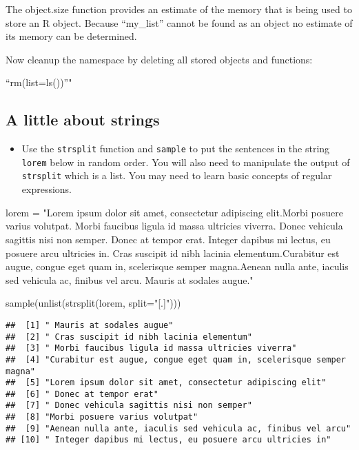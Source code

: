 \documentclass[
]{article}
\newenvironment{Shaded}{\begin{snugshade}}{\end{snugshade}}
\newcommand{\AttributeTok}[1]{\textcolor[rgb]{0.77,0.63,0.00}{#1}}
\newcommand{\FunctionTok}[1]{\textcolor[rgb]{0.00,0.00,0.00}{#1}}
\newcommand{\NormalTok}[1]{#1}
\newcommand{\OtherTok}[1]{\textcolor[rgb]{0.56,0.35,0.01}{#1}}
\newcommand{\StringTok}[1]{\textcolor[rgb]{0.31,0.60,0.02}{#1}}
\providecommand{\tightlist}{%
  \setlength{\itemsep}{0pt}\setlength{\parskip}{0pt}}
\begin{document}
The object.size function provides an estimate of the memory that is
being used to store an R object. Because ``my\_list'' cannot be found as
an object no estimate of its memory can be determined.

Now cleanup the namespace by deleting all stored objects and functions:

``rm(list=ls())''"

\hypertarget{a-little-about-strings}{%
\subsection{A little about strings}\label{a-little-about-strings}}

\begin{itemize}
\tightlist
\item
  Use the \texttt{strsplit} function and \texttt{sample} to put the
  sentences in the string \texttt{lorem} below in random order. You will
  also need to manipulate the output of \texttt{strsplit} which is a
  list. You may need to learn basic concepts of regular expressions.
\end{itemize}

\begin{Shaded}
\begin{Highlighting}[]
\NormalTok{lorem }\OtherTok{=} \StringTok{"Lorem ipsum dolor sit amet, consectetur adipiscing elit.Morbi posuere varius volutpat. Morbi faucibus ligula id massa ultricies viverra. Donec vehicula sagittis nisi non semper. Donec at tempor erat. Integer dapibus mi lectus, eu posuere arcu ultricies in. Cras suscipit id nibh lacinia elementum.Curabitur est augue, congue eget quam in, scelerisque semper magna.Aenean nulla ante, iaculis sed vehicula ac, finibus vel arcu. Mauris at sodales augue."}

\FunctionTok{sample}\NormalTok{(}\FunctionTok{unlist}\NormalTok{(}\FunctionTok{strsplit}\NormalTok{(lorem, }\AttributeTok{split=}\StringTok{"[.]"}\NormalTok{)))}
\end{Highlighting}
\end{Shaded}

\begin{verbatim}
##  [1] " Mauris at sodales augue"                                          
##  [2] " Cras suscipit id nibh lacinia elementum"                          
##  [3] " Morbi faucibus ligula id massa ultricies viverra"                 
##  [4] "Curabitur est augue, congue eget quam in, scelerisque semper magna"
##  [5] "Lorem ipsum dolor sit amet, consectetur adipiscing elit"           
##  [6] " Donec at tempor erat"                                             
##  [7] " Donec vehicula sagittis nisi non semper"                          
##  [8] "Morbi posuere varius volutpat"                                     
##  [9] "Aenean nulla ante, iaculis sed vehicula ac, finibus vel arcu"      
## [10] " Integer dapibus mi lectus, eu posuere arcu ultricies in"
\end{verbatim}
\end{document}
